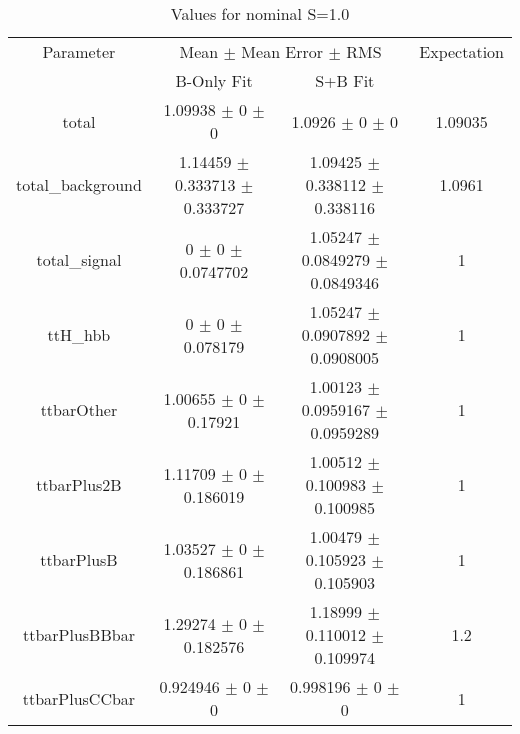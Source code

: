 \begin{table}
\centering
\caption{Values for nominal S=1.0}
\begin{tabular}{cccc}
\toprule
Parameter & \multicolumn{2}{c}{Mean $\pm$ Mean Error $\pm$ RMS} & Expectation\\
 & B-Only Fit & S+B Fit & \\
\midrule
total & \num{1.09938} $\pm$ \num{0} $\pm$ \num{0} & \num{1.0926} $\pm$ \num{0} $\pm$ \num{0} & \num{1.09035}\\
total\_background & \num{1.14459} $\pm$ \num{0.333713} $\pm$ \num{0.333727} & \num{1.09425} $\pm$ \num{0.338112} $\pm$ \num{0.338116} & \num{1.0961}\\
total\_signal & \num{0} $\pm$ \num{0} $\pm$ \num{0.0747702} & \num{1.05247} $\pm$ \num{0.0849279} $\pm$ \num{0.0849346} & \num{1}\\
ttH\_hbb & \num{0} $\pm$ \num{0} $\pm$ \num{0.078179} & \num{1.05247} $\pm$ \num{0.0907892} $\pm$ \num{0.0908005} & \num{1}\\
ttbarOther & \num{1.00655} $\pm$ \num{0} $\pm$ \num{0.17921} & \num{1.00123} $\pm$ \num{0.0959167} $\pm$ \num{0.0959289} & \num{1}\\
ttbarPlus2B & \num{1.11709} $\pm$ \num{0} $\pm$ \num{0.186019} & \num{1.00512} $\pm$ \num{0.100983} $\pm$ \num{0.100985} & \num{1}\\
ttbarPlusB & \num{1.03527} $\pm$ \num{0} $\pm$ \num{0.186861} & \num{1.00479} $\pm$ \num{0.105923} $\pm$ \num{0.105903} & \num{1}\\
ttbarPlusBBbar & \num{1.29274} $\pm$ \num{0} $\pm$ \num{0.182576} & \num{1.18999} $\pm$ \num{0.110012} $\pm$ \num{0.109974} & \num{1.2}\\
ttbarPlusCCbar & \num{0.924946} $\pm$ \num{0} $\pm$ \num{0} & \num{0.998196} $\pm$ \num{0} $\pm$ \num{0} & \num{1}\\
\bottomrule
\end{tabular}
\end{table}